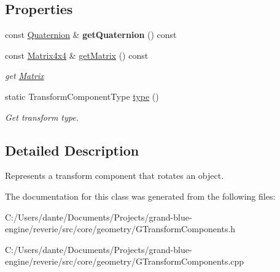 \subsection*{Properties}
\begin{DoxyCompactItemize}
\item 
\mbox{\label{classrev_1_1_rotation_component_a930d924911dedca160a3184004a486e0}} 
const \mbox{\hyperlink{classrev_1_1_quaternion}{Quaternion}} \& {\bfseries get\+Quaternion} () const
\item 
\mbox{\label{classrev_1_1_rotation_component_af6a7c1c87ace34e093e14e386688fcde}} 
const \mbox{\hyperlink{classrev_1_1_square_matrix}{Matrix4x4}} \& \mbox{\hyperlink{classrev_1_1_rotation_component_af6a7c1c87ace34e093e14e386688fcde}{get\+Matrix}} () const
\begin{DoxyCompactList}\small\item\em get \mbox{\hyperlink{classrev_1_1_matrix}{Matrix}} \end{DoxyCompactList}\item 
\mbox{\label{classrev_1_1_rotation_component_ae6f59528f1c5c52662460559ff61c71f}} 
static Transform\+Component\+Type \mbox{\hyperlink{classrev_1_1_rotation_component_ae6f59528f1c5c52662460559ff61c71f}{type}} ()
\begin{DoxyCompactList}\small\item\em Get transform type. \end{DoxyCompactList}\end{DoxyCompactItemize}


\subsection{Detailed Description}
Represents a transform component that rotates an object. 

The documentation for this class was generated from the following files\+:\begin{DoxyCompactItemize}
\item 
C\+:/\+Users/dante/\+Documents/\+Projects/grand-\/blue-\/engine/reverie/src/core/geometry/G\+Transform\+Components.\+h\item 
C\+:/\+Users/dante/\+Documents/\+Projects/grand-\/blue-\/engine/reverie/src/core/geometry/G\+Transform\+Components.\+cpp\end{DoxyCompactItemize}
